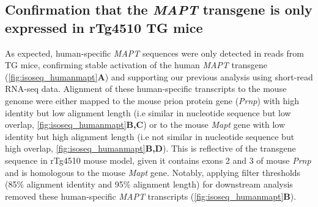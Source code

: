 \begin{figure}[p]
	\captionsetup{width=0.95\textwidth}
\end{figure}


\subsection{Confirmation that the \textit{MAPT} transgene is only expressed in rTg4510 TG mice}
\label{mapt_transgene_whole}
As expected, human-specific \textit{MAPT} sequences were only detected in reads from TG mice, confirming stable activation of the human \textit{MAPT} transgene (\cref{fig:isoseq_humanmapt}\textbf{A}) and supporting our previous analysis using short-read RNA-seq data\cite{Castanho2020}. Alignment of these human-specific transcripts to the mouse genome were either mapped to the mouse prion protein gene (\textit{Prnp}) with high identity but low alignment length (i.e similar in nucleotide sequence but low overlap, \cref{fig:isoseq_humanmapt}\textbf{B,C}) or to the mouse \textit{Mapt} gene with low identity but high alignment length (i.e not similar in nucleotide sequence but high overlap, \cref{fig:isoseq_humanmapt}\textbf{B,D}). This is reflective of the transgene sequence in rTg4510 mouse model, given it contains exons 2 and 3 of mouse \textit{Prnp}\cite{Ramsden2005} and is homologous to the mouse \textit{Mapt} gene. Notably, applying filter thresholds (85\% alignment identity and 95\% alignment length) for downstream analysis removed these human-specific \textit{MAPT} transcripts (\cref{fig:isoseq_humanmapt}\textbf{B}). 

